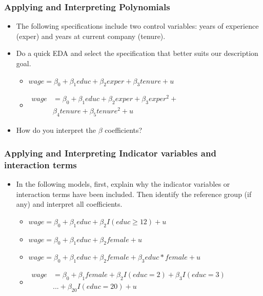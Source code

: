 \documentclass[
]{book}
\theoremstyle{definition}
\theoremstyle{definition}
\theoremstyle{definition}
\theoremstyle{definition}
\theoremstyle{remark}
\begin{document}
\hypertarget{applying-and-interpreting-polynomials}{%
\subsubsection{Applying and Interpreting Polynomials}\label{applying-and-interpreting-polynomials}}

\begin{itemize}
\item
  The following specifications include two control variables: years of experience (exper) and years at current company (tenure).
\item
  Do a quick EDA and select the specification that better suits our description goal.

  \begin{itemize}
  \item
    \(wage = \beta_0 + \beta_1 educ + \beta_2 exper + \beta_3 tenure + u\)
  \item
    \(\begin{aligned} wage &= \beta_0 + \beta_1 educ + \beta_2 exper + \beta_3 exper^2 + \\ & \beta_4 tenure + \beta_5 tenure^2 + u \end{aligned}\)
  \end{itemize}
\item
  How do you interpret the \(\beta\) coefficients?
\end{itemize}

\hypertarget{applying-and-interpreting-indicator-variables-and-interaction-terms}{%
\subsubsection{Applying and Interpreting Indicator variables and interaction terms}\label{applying-and-interpreting-indicator-variables-and-interaction-terms}}

\begin{itemize}
\item
  In the following models, first, explain why the indicator variables or interaction terms have been included. Then identify the reference group (if any) and interpret all coefficients.

  \begin{itemize}
  \item
    \(wage = \beta_0 + \beta_1 educ + \beta_2 I(educ \geq 12) + u\)
  \item
    \(wage = \beta_0 + \beta_1 educ + \beta_2 female + u\)
  \item
    \(wage = \beta_0 + \beta_1 educ + \beta_2 female + \beta_3 educ*female + u\)
  \item
    \(\begin{aligned} wage &= \beta_0 + \beta_1 female + \beta_2 I(educ = 2) + \beta_3 I(educ = 3)\\ &...+ \beta_{20} I(educ = 20) + u\\ \end{aligned}\)
  \end{itemize}
\end{itemize}
\end{document}
